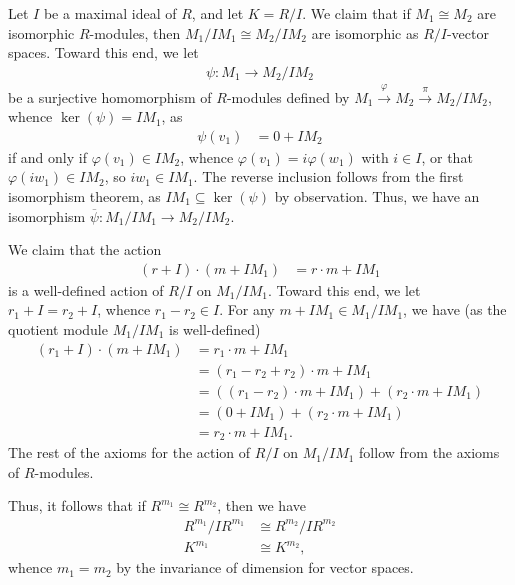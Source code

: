 \documentclass[10pt]{mypackage}
\begin{document}
\begin{solution}
  Let $I$ be a maximal ideal of $R$, and let $K = R/I$. We claim that if $M_1\cong M_2$ are isomorphic $R$-modules, then $M_1/IM_1 \cong M_2/IM_2$ are isomorphic as $R/I$-vector spaces. Toward this end, we let
  \begin{align*}
    \psi\colon M_1\rightarrow M_2/IM_2
  \end{align*}
  be a surjective homomorphism of $R$-modules defined by $M_1\xrightarrow{\varphi}M_2\xrightarrow{\pi} M_2/IM_2$, whence $\ker\left( \psi \right) = IM_1$, as
  \begin{align*}
    \psi\left( v_1 \right) &= 0 + IM_2
  \end{align*}
  if and only if $\varphi\left( v_1 \right) \in IM_2$, whence $\varphi\left( v_1 \right) = i \varphi\left( w_1 \right)$ with $i\in I$, or that $\varphi\left( iw_1 \right)\in IM_2$, so $iw_1\in IM_1$. The reverse inclusion follows from the first isomorphism theorem, as $IM_1\subseteq \ker\left( \psi \right)$ by observation. Thus, we have an isomorphism $ \overline{\psi}\colon M_1/IM_1\rightarrow M_2/IM_2 $.\newline

  We claim that the action
  \begin{align*}
    \left( r + I \right)\cdot \left( m + IM_1 \right) &= r\cdot m + IM_1
  \end{align*}
  is a well-defined action of $R/I$ on $M_1/IM_1$. Toward this end, we let $r_1 + I = r_2 + I$, whence $r_1-r_2\in I$. For any $m + IM_1\in M_1/IM_1$, we have (as the quotient module $M_1/IM_1$ is well-defined)
  \begin{align*}
    \left( r_1 + I \right)\cdot \left( m + IM_1 \right) &= r_1\cdot m + IM_1\\
                                                        &= \left( r_1 - r_2 + r_2 \right)\cdot m + IM_1\\
                                                        &= \left( \left( r_1 - r_2 \right)\cdot m + IM_1 \right) + \left( r_2\cdot m + IM_1 \right)\\
                                                        &= \left( 0 + IM_1 \right) + \left( r_2\cdot m + IM_1 \right)\\
                                                        &= r_2\cdot m + IM_1.
  \end{align*}
  The rest of the axioms for the action of $R/I$ on $M_1/IM_1$ follow from the axioms of $R$-modules.\newline

  Thus, it follows that if $R^{m_1}\cong R^{m_2}$, then we have
  \begin{align*}
    R^{m_1}/IR^{m_1} &\cong R^{m_2}/IR^{m_2}\\
    K^{m_1} &\cong K^{m_2},
  \end{align*}
  whence $m_1=m_2$ by the invariance of dimension for vector spaces.
\end{solution}
\end{document}

